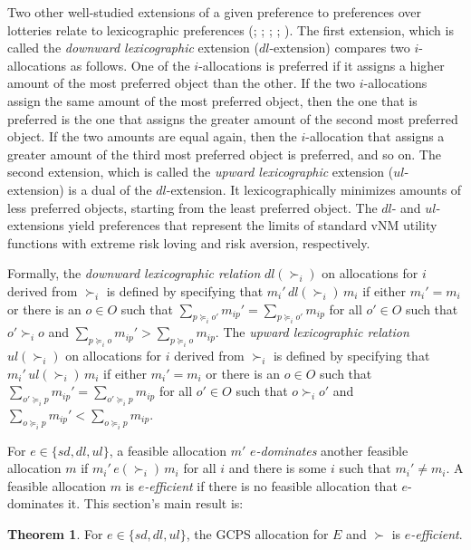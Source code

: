 \documentclass[12pt]{article}
\theoremstyle{definition}
\newtheorem{thm}{Theorem}
\begin{document}
Two other well-studied extensions of a given preference to preferences over lotteries relate to lexicographic preferences (\citealp{cho16geb}; \citealp{sv15wp}; \citealp{cd16}; \citealp{ss14jme}; \citealp{cho18scw}). The first extension, which is called the \emph{downward lexicographic} extension ($dl$-extension) compares two $i$-allocations as follows. One of the $i$-allocations is preferred if it assigns a higher amount of the most preferred object than the other. If the two $i$-allocations assign the same amount of the most preferred object, then the one that is preferred is the one that assigns the greater amount of the second most preferred object. If the two amounts are equal again, then the $i$-allocation that assigns a greater amount of the third most preferred object is preferred, and so on.
The second extension, which is called the \emph{upward lexicographic} extension ($ul$-extension) is a dual of the $dl$-extension. It lexicographically minimizes amounts of less preferred objects, starting from the least preferred object.  The $dl$- and $ul$-extensions yield preferences that represent the limits of standard vNM utility functions with extreme risk loving and risk aversion, respectively. 

Formally, the \emph{downward lexicographic relation} ${dl}(\succ_i)$ on allocations for $i$ derived from $\succ_i$ is defined by specifying that $m_i' \, {dl}(\succ_i) \, m_i$ if  either $m_i' = m_i$ or there is an $o \in O$ such that $\sum_{p \succeq_i o'} m_{ip}' = \sum_{p \succeq_i o'} m_{ip}$ for all $o' \in O$ such that $o' \succ_i o$ and $\sum_{p \succeq_i o} m_{ip}' > \sum_{p \succeq_i o} m_{ip}$.   The \emph{upward lexicographic relation} ${ul}(\succ_i)$ on allocations for $i$ derived from $\succ_i$ is defined by specifying that $m_i' \, {ul}(\succ_i) \, m_i$ if  either $m_i' = m_i$ or there is an $o \in O$ such that $\sum_{o' \succeq_i p} m_{ip}' = \sum_{o' \succeq_i p} m_{ip}$ for all $o' \in O$ such that $o \succ_i o'$ and $\sum_{o \succeq_i p} m_{ip}' < \sum_{o \succeq_i p} m_{ip}$.

For $e \in \{sd,dl,ul\}$, a feasible allocation $m'$ \emph{$e$-dominates} another feasible allocation $m$ if $m_i' \, e(\succ_i) \, m_i$ for all $i$ and there is some $i$ such that $m_i' \ne m_i$.  A feasible allocation $m$ is \emph{$e$-efficient} if there is no feasible allocation that $e$-dominates it.  This section's main result is:

\begin{thm}\label{th:axiom_topdown}
For $e \in \{sd,dl,ul\}$, the GCPS allocation for $E$ and $\succ$ is \emph{$e$-efficient}.  
\end{thm}
\end{document}
